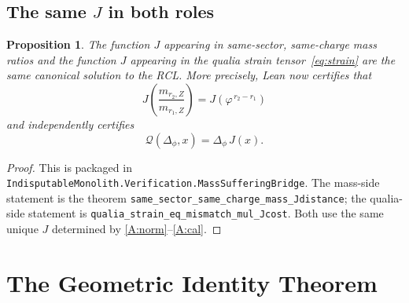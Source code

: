 \documentclass[11pt,a4paper]{article}
\theoremstyle{plain}
\newtheorem{proposition}[theorem]{Proposition}
\theoremstyle{definition}
\theoremstyle{remark}
\newcommand{\Jcost}{J}
\newcommand{\vp}{\varphi}
\begin{document}
\subsection{The same $\Jcost$ in both roles}

\begin{proposition}
\label{prop:same-J}
The function $\Jcost$ appearing in same-sector, same-charge mass ratios
and the function $\Jcost$ appearing in the qualia strain
tensor~\eqref{eq:strain} are the same canonical solution to the RCL.
More precisely, Lean now certifies that
\[
\Jcost\!\left(\frac{m_{r_2,Z}}{m_{r_1,Z}}\right)
=
\Jcost\!\left(\vp^{\,r_2-r_1}\right)
\]
and independently certifies
\[
\mathcal{Q}(\Delta_\phi,x)=\Delta_\phi\,\Jcost(x).
\]
\end{proposition}

\begin{proof}
This is packaged in
\texttt{IndisputableMonolith.Verification.MassSufferingBridge}.  The
mass-side statement is the theorem
\texttt{same\_sector\_same\_charge\_mass\_Jdistance}; the qualia-side
statement is \texttt{qualia\_strain\_eq\_mismatch\_mul\_Jcost}.  Both
use the same unique $\Jcost$ determined by \ref{A:norm}--\ref{A:cal}.
\end{proof}

\section{The Geometric Identity Theorem}
\label{sec:identity}
\end{document}
